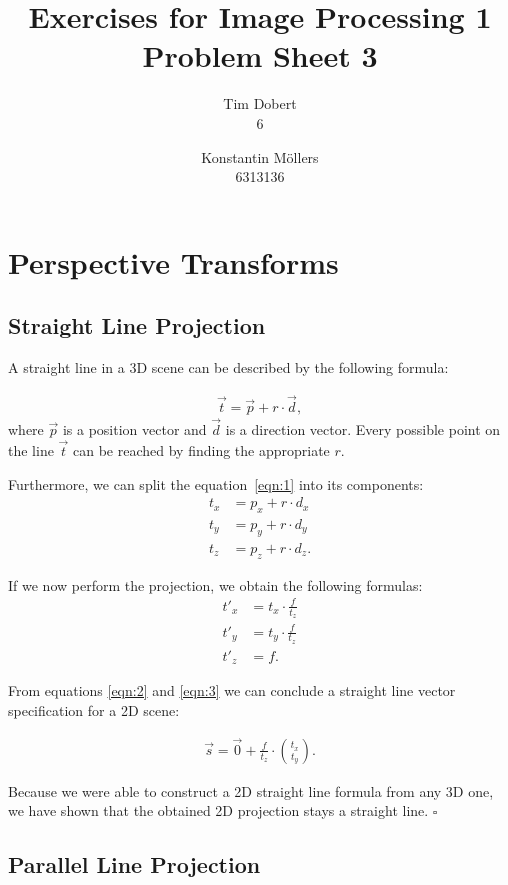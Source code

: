 \documentclass[a4paper,12pt]{article}
\title{\textbf{Exercises for Image Processing 1}\\Problem Sheet 3}
\author{Tim Dobert\\6 \and Konstantin M\"ollers\\6313136}
\begin{document}
	\maketitle
	
	\section{Perspective Transforms}
	
	\subsection{Straight Line Projection}
	
	A straight line in a 3D scene can be described by the following formula:
	
	\begin{align}\label{eqn:1} \vec{t} = \vec{p} + r \cdot \vec{d},\end{align}
	where $\vec{p}$ is a position vector and $\vec{d}$ is a direction vector. Every possible point on the line $\vec{t}$ can be reached by finding the appropriate $r$.
	
	Furthermore, we can split the equation~\ref{eqn:1} into its components:
	\begin{align}
		t_x &= p_x + r \cdot d_x \\
		t_y &= p_y + r \cdot d_y \\
		t_z &= p_z + r \cdot d_z.
	\end{align}
	
	If we now perform the projection, we obtain the following formulas:
	\begin{align}
		\label{eqn:2} t'_{x} &= t_x \cdot \frac{f}{t_z} \\
		\label{eqn:3}t'_{y} &= t_y \cdot \frac{f}{t_z}\\
		t'_{z} &= f.
	\end{align}
	
	From equations \ref{eqn:2} and \ref{eqn:3} we can conclude a straight line vector specification for a 2D scene:
	
	\begin{align}\label{eqn:4} \vec{s} = \vec{0} + \frac{f}{t_z} \cdot \binom{t_x}{t_y}.\end{align}
	
	Because we were able to construct a 2D straight line formula from any 3D one, we have shown that the obtained 2D projection stays a straight line. $\square$
	
	\subsection{Parallel Line Projection}
	
\end{document}
